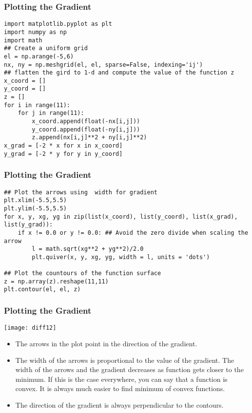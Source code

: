  \begin{frame}[fragile] \frametitle{Plotting the Gradient}

\begin{lstlisting}
import matplotlib.pyplot as plt
import numpy as np
import math
## Create a uniform grid
el = np.arange(-5,6)
nx, ny = np.meshgrid(el, el, sparse=False, indexing='ij')
## flatten the gird to 1-d and compute the value of the function z
x_coord = []
y_coord = []
z = []
for i in range(11):  
    for j in range(11):
        x_coord.append(float(-nx[i,j]))
        y_coord.append(float(-ny[i,j]))       
        z.append(nx[i,j]**2 + ny[i,j]**2)
x_grad = [-2 * x for x in x_coord]
y_grad = [-2 * y for y in y_coord] 
\end{lstlisting}
 

\end{frame}


 \begin{frame}[fragile] \frametitle{Plotting the Gradient}

\begin{lstlisting}
## Plot the arrows using  width for gradient
plt.xlim(-5.5,5.5)
plt.ylim(-5.5,5.5)
for x, y, xg, yg in zip(list(x_coord), list(y_coord), list(x_grad), list(y_grad)):
    if x != 0.0 or y != 0.0: ## Avoid the zero divide when scaling the arrow
        l = math.sqrt(xg**2 + yg**2)/2.0
        plt.quiver(x, y, xg, yg, width = l, units = 'dots')

## Plot the countours of the function surface
z = np.array(z).reshape(11,11)    
plt.contour(el, el, z)
\end{lstlisting}
 

\end{frame}

 \begin{frame}[fragile] \frametitle{Plotting the Gradient}

\begin{center}
\texttt{[image: diff12]}
\end{center}
\begin{itemize}
\item The arrows in the plot point in the direction of the gradient.
\item The width of the arrows is proportional to the value of the gradient. The width of the arrows and the gradient decreases as function gets closer to the minimum. If this is the case everywhere, you can say that a function is convex. It is always much easier to find minimum of convex functions.
\item The direction of the gradient is always perpendicular to the contours. 
\end{itemize}

\end{frame}


